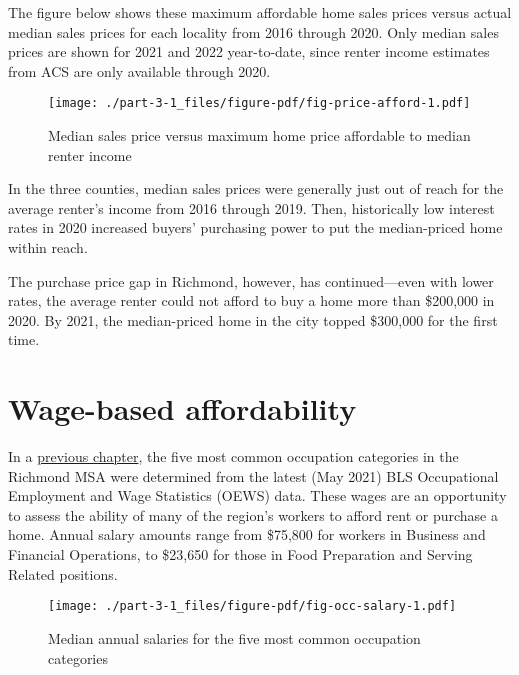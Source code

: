 \documentclass[
  letterpaper,
  DIV=11,
  numbers=noendperiod]{scrreprt}
\begin{document}
The figure below shows these maximum affordable home sales prices versus
actual median sales prices for each locality from 2016 through 2020.
Only median sales prices are shown for 2021 and 2022 year-to-date, since
renter income estimates from ACS are only available through 2020.

\begin{figure}

{\centering \texttt{[image: ./part-3-1\_files/figure-pdf/fig-price-afford-1.pdf]}

}

\caption{\label{fig-price-afford}Median sales price versus maximum home
price affordable to median renter income}

\end{figure}

In the three counties, median sales prices were generally just out of
reach for the average renter's income from 2016 through 2019. Then,
historically low interest rates in 2020 increased buyers' purchasing
power to put the median-priced home within reach.

The purchase price gap in Richmond, however, has continued---even with
lower rates, the average renter could not afford to buy a home more than
\$200,000 in 2020. By 2021, the median-priced home in the city topped
\$300,000 for the first time.

\hypertarget{wage-based-affordability}{%
\section{Wage-based affordability}\label{wage-based-affordability}}

In a \protect\hyperlink{wages}{previous chapter}, the five most common
occupation categories in the Richmond MSA were determined from the
latest (May 2021) BLS Occupational Employment and Wage Statistics (OEWS)
data. These wages are an opportunity to assess the ability of many of
the region's workers to afford rent or purchase a home. Annual salary
amounts range from \$75,800 for workers in Business and Financial
Operations, to \$23,650 for those in Food Preparation and Serving
Related positions.

\begin{figure}

{\centering \texttt{[image: ./part-3-1\_files/figure-pdf/fig-occ-salary-1.pdf]}

}

\caption{\label{fig-occ-salary}Median annual salaries for the five most
common occupation categories}

\end{figure}
\end{document}
